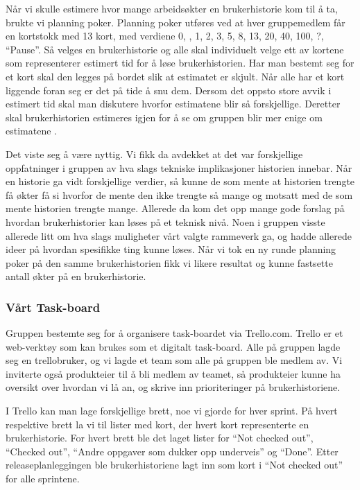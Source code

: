 \documentclass[12pt,a4paper,norsk]{article}
\begin{document}
    Når vi skulle estimere hvor mange arbeidsøkter en brukerhistorie kom til å ta, brukte vi planning poker. Planning poker utføres ved at hver gruppemedlem får en kortstokk med 13 kort, med verdiene 0, , 1, 2, 3, 5, 8, 13, 20, 40, 100, ?, “Pause”. Så velges en brukerhistorie og alle skal individuelt velge ett av kortene som representerer estimert tid for å løse brukerhistorien. Har man bestemt seg for et kort skal den legges på bordet slik at estimatet er skjult. Når alle har et kort liggende foran seg er det på tide å snu dem. Dersom det oppsto store avvik i estimert tid skal man diskutere hvorfor estimatene blir så forskjellige. Deretter skal brukerhistorien estimeres igjen for å se om gruppen blir mer enige om estimatene \cite[side 38-40]{kniberg}.

    Det viste seg å være nyttig. Vi fikk da avdekket at det var forskjellige oppfatninger i gruppen av hva slags tekniske implikasjoner historien innebar. Når en historie ga vidt forskjellige verdier, så kunne de som mente at historien trengte få økter få si hvorfor de mente den ikke trengte så mange og motsatt med de som mente historien trengte mange. Allerede da kom det opp mange gode forslag på hvordan brukerhistorier kan løses på et teknisk nivå. Noen i gruppen visste allerede litt om hva slags muligheter vårt valgte rammeverk ga, og hadde allerede ideer på hvordan spesifikke ting kunne løses. Når vi tok en ny runde planning poker på den samme brukerhistorien fikk vi likere resultat og kunne fastsette antall økter på en brukerhistorie. 

	
	\subsubsection{Vårt Task-board}
	Gruppen bestemte seg for å organisere task-boardet via Trello.com. Trello er et web-verktøy som kan brukes som et digitalt task-board. Alle på gruppen lagde seg en trellobruker, og vi lagde et team som alle på gruppen ble medlem av. Vi inviterte også produkteier til å bli medlem av teamet, så produkteier kunne ha oversikt over hvordan vi lå an, og skrive inn prioriteringer på brukerhistoriene. 

    I Trello kan man lage forskjellige brett, noe vi gjorde for hver sprint. På hvert respektive brett la vi til lister med kort, der hvert kort representerte en brukerhistorie. For hvert brett ble det laget lister for “Not checked out”, “Checked out”, “Andre oppgaver som dukker opp underveis” og “Done”. Etter releaseplanleggingen ble brukerhistoriene lagt inn som kort i “Not checked out” for alle sprintene. 
    
\end{document}
